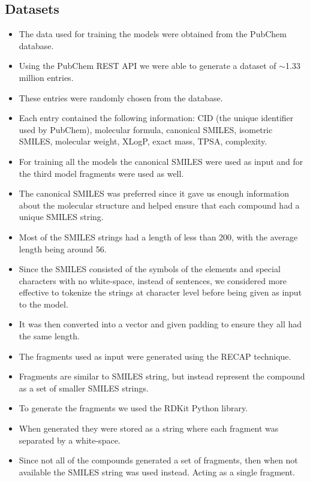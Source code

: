     \subsection{Datasets}
        \begin{itemize}
            \item The data used for training the models were obtained from the PubChem database\cite{}.
            \item Using the PubChem REST API we were able to generate a dataset of $\sim$1.33 million entries.
            \item These entries were randomly chosen from the database.
            \item Each entry contained the following information: CID (the unique identifier used by PubChem), molecular formula, canonical SMILES, isometric SMILES, molecular weight, XLogP, exact mass, TPSA, complexity.
            \item For training all the models the canonical SMILES were used as input and for the third model fragments were used as well.
            \item The canonical SMILES was preferred since it gave us enough information about the molecular structure and helped ensure that each compound had a unique SMILES string.
            \item Most of the SMILES strings had a length of less than 200, with the average length being around 56.
            \item Since the SMILES consisted of the symbols of the elements and special characters with no white-space, instead of sentences, we considered more effective to tokenize the strings at character level before being given as input to the model. 
            \item It was then converted into a vector and given padding to ensure they all had the same length.
            \item The fragments used as input were generated using the RECAP technique.
            \item Fragments are similar to SMILES string, but instead represent the compound as a set of smaller SMILES strings.
            \item To generate the fragments we used the RDKit \cite{rdkit} Python library.
            \item When generated they were stored as a string where each fragment was separated by a white-space.
            \item Since not all of the compounds generated a set of fragments, then when not available the SMILES string was used instead. Acting as a single fragment.

\end{itemize}
